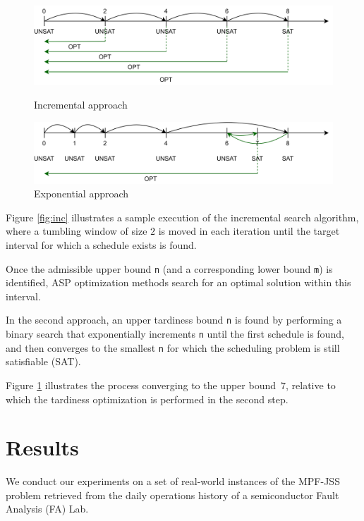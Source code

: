 \documentclass[submission,copyright,creativecommons]{eptcs}
\newcommand{\jss}{MPF-JSS\xspace}
\begin{document}
\begin{figure}[b]
	\centering
	\includegraphics[width=0.5\linewidth]{figures/incremental.pdf}
	\caption{Incremental approach \label{fig:inc}}
        \smallskip %
        \bigskip
	\includegraphics[width=0.5\linewidth]{figures/exponential.pdf}
	\caption{Exponential approach \label{fig:exp}}
\end{figure}

Figure \ref{fig:inc} illustrates a sample execution of the incremental search algorithm, where a tumbling window of size $2$ is moved in each iteration until the target interval for which a schedule exists is found. 

Once the admissible upper bound \lstinline{n} (and a corresponding lower bound \lstinline{m}) is identified, ASP optimization methods search for an optimal solution within this interval.

In the second approach, an upper tardiness bound \lstinline{n} is found by performing a binary search that exponentially increments \lstinline{n} until the first schedule is found, and then converges to the smallest \lstinline{n} for which the scheduling problem is still satisfiable (SAT).

Figure \ref{fig:exp} illustrates the process converging to the upper bound~$7$,
relative to which the tardiness optimization is performed in the second step.

\section{Results}

We conduct our experiments on a set of real-world instances of the \jss problem retrieved from the daily operations history of a semiconductor Fault Analysis (FA) Lab.%
\end{document}
